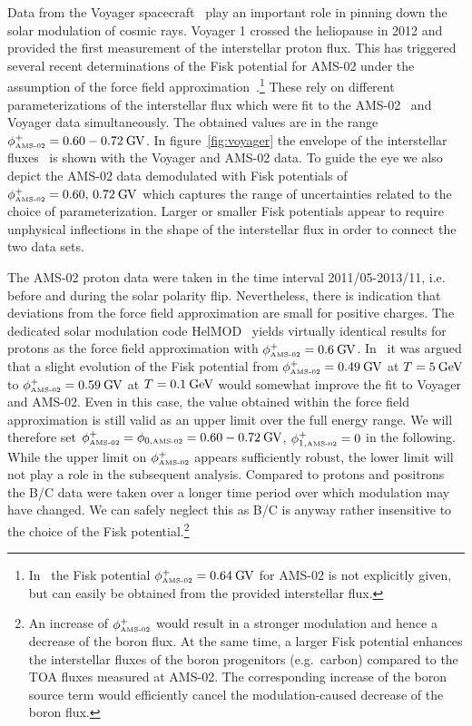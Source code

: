\documentclass[a4paper,11pt]{article}
\newcommand{\eVdist}{\kern-0.06em}
\newcommand{\gev}{\:\text{Ge\eVdist V}}
\newcommand{\gv}{\:\text{G\eVdist V}}
\begin{document}
Data from the Voyager spacecraft~\cite{Stone:2013} play an important role in pinning down the solar modulation of cosmic rays. Voyager 1 crossed the heliopause in 2012 and provided the first measurement of the interstellar proton flux. This has triggered several recent determinations of the Fisk potential for AMS-02 under the assumption of the force field approximation~\cite{Vos:2015,Ghelfi:2015tvu,Corti:2015bqi}.\footnote{In~\cite{Vos:2015} the Fisk potential $\phi^+_{\text{\tiny{AMS-02}}}=0.64\gv$ for AMS-02 is not explicitly given, but can easily be obtained from the provided interstellar flux.} These rely on different parameterizations of the interstellar flux which were fit to the AMS-02~\cite{Aguilar:2015ooa} and Voyager data simultaneously. The obtained values are in the range $\phi^{+}_{\text{\tiny{AMS-02}}}=0.60-0.72\gv$. In figure~\ref{fig:voyager} the envelope of the interstellar fluxes~\cite{Vos:2015,Ghelfi:2015tvu,Corti:2015bqi} is shown with the Voyager and AMS-02 data. To guide the eye we also depict the AMS-02 data demodulated with Fisk potentials of $\phi^{+}_{\text{\tiny{AMS-02}}}=0.60,\,0.72\gv$ which captures the range of uncertainties related to the choice of parameterization. Larger or smaller Fisk potentials appear to require unphysical inflections in the shape of the interstellar flux in order to connect the two data sets. 

The AMS-02 proton data were taken in the time interval 2011/05-2013/11, i.e. before and during the solar polarity flip. Nevertheless, there is indication that deviations from the force field approximation are small for positive charges. The dedicated solar modulation code HelMOD~\cite{Boschini:2017gic} yields virtually identical results for protons as the force field approximation with $\phi^{+}_{\text{\tiny{AMS-02}}}=0.6\gv$. In~\cite{Corti:2015bqi} it was argued that a slight evolution of the Fisk potential from $\phi^{+}_{\text{\tiny{AMS-02}}}=0.49\gv$ at $T=5\gev$ to $\phi^{+}_{\text{\tiny{AMS-02}}}=0.59\gv$ at $T=0.1\gev$ would somewhat improve the fit to Voyager and AMS-02. Even in this case, the value obtained within the force field approximation is still valid as an upper limit over the full energy range. We will therefore set $\phi^{+}_{\text{\tiny{AMS-02}}}=\phi_{0,\text{\tiny{AMS-02}}} = 0.60-0.72\gv$, $\phi^+_{1,\text{\tiny{AMS-02}}}=0$ in the following. While the upper limit on $\phi^{+}_{\text{\tiny{AMS-02}}}$ appears sufficiently robust, the lower limit will not play a role in the subsequent analysis. Compared to protons and positrons the B/C data were taken over a longer time period over which modulation may have changed. We can safely neglect this as B/C is anyway rather insensitive to the choice of the Fisk potential.\footnote{\label{footnote}An increase of $\phi^{+}_{\text{\tiny{AMS-02}}}$ would result in a stronger modulation and hence a decrease of the boron flux. At the same time, a larger Fisk potential enhances the interstellar fluxes of the boron progenitors (e.g.\ carbon) compared to the TOA fluxes measured at AMS-02. The corresponding increase of the boron source term would efficiently cancel the modulation-caused decrease of the boron flux.}
\end{document}
